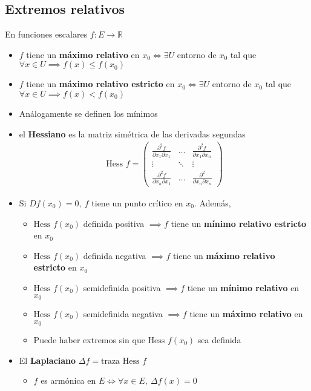 \documentclass[a4paper,twocolumn]{extarticle}
\newcommand{\R}{\mathbb{R}}
\newcommand{\hess}{\text{Hess }}
\newcommand{\tr}{\text{traza }}
\begin{document}
\subsection{Extremos relativos}
En funciones escalares $f:E \to \R$
\begin{itemize}
	\item $f$ tiene un \textbf{máximo relativo} en $x_0 \iff \exists U$ entorno de $x_0$ tal que $\forall x \in U \implies f(x) \leq f(x_0)$
	\item $f$ tiene un \textbf{máximo relativo estricto} en $x_0 \iff \exists U$ entorno de $x_0$ tal que $\forall x \in U \implies f(x) < f(x_0)$
	\item Análogamente se definen los mínimos
	\item  el \textbf{Hessiano} es la matriz simétrica de las derivadas segundas
	\begin{align*}
		\hess f = \left(\begin{array}{ccc}
		\frac{\partial^2f}{\partial x_1\partial x_1} & \dots & \frac{\partial^2 f}{\partial x_1 \partial x_n} \\
		\vdots & \ddots & \vdots \\
		\frac{\partial^2f}{\partial x_n \partial x_1} & \dots & \frac{\partial^2}{\partial x_n \partial x_n}
		\end{array}\right)
	\end{align*}
	\item Si $Df(x_0) = 0,\ f$ tiene un punto crítico en $x_0$. Además,
	\begin{itemize}
		\item $\hess f(x_0)$ definida positiva $\implies f$ tiene un \textbf{mínimo relativo estricto} en $x_0$
		\item $\hess f(x_0)$ definida negativa $\implies f$ tiene un \textbf{máximo relativo estricto} en $x_0$
		\item $\hess f(x_0)$ semidefinida positiva $\implies f$ tiene un \textbf{mínimo relativo} en $x_0$
		\item $\hess f(x_0)$ semidefinida negativa $\implies f$ tiene un \textbf{máximo relativo} en $x_0$
		\item Puede haber extremos sin que $\hess f(x_0)$ sea definida
	\end{itemize}
	\item El \textbf{Laplaciano} $\Delta f = \tr \hess f$
	\begin{itemize}
		\item $f$ es armónica en $E \iff \forall x \in E,\ \Delta f(x) = 0$
	\end{itemize}

\end{itemize}
\end{document}
